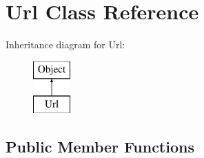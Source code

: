 \hypertarget{class_url}{\section{Url Class Reference}
\label{class_url}
}
Inheritance diagram for Url\-:\begin{figure}[H]
\begin{center}
\leavevmode
\includegraphics[height=2.000000cm]{class_url}
\end{center}
\end{figure}
\subsection*{Public Member Functions}
